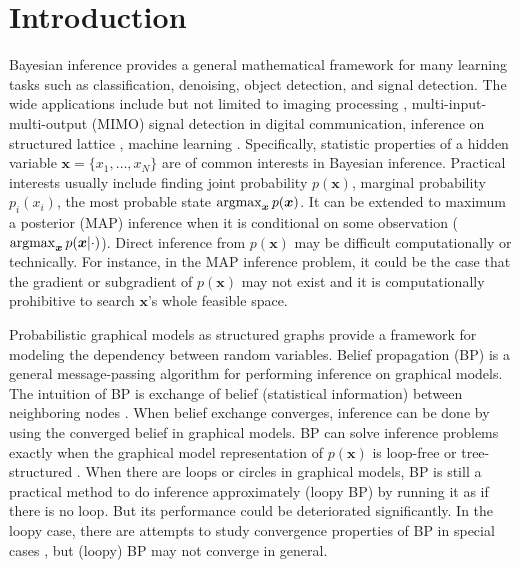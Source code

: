 \documentclass[conference]{IEEEtran}
\begin{document}
\section{Introduction}\label{sec:introduction}
Bayesian inference provides a general mathematical framework for many learning tasks such as classification, denoising, object detection, and signal detection. The wide applications include but not limited to imaging processing \cite{zhang2013denoise}, multi-input-multi-output (MIMO) signal detection in digital communication\cite{cespedes2014ep}, inference on structured lattice \cite{10.2307/25651244}, machine learning  \cite{2018arXiv180607066M, Lin:2015:DLM:2969239.2969280, yoon2019inferenceGraph}.
Specifically, statistic properties of a hidden variable $\bm{x} = \{x_1,\dots,x_N\}$ are of common interests in Bayesian inference. Practical interests usually include finding joint probability $p(\bm{x})$, marginal probability $p_i(x_i)$, the most probable state $\operatorname{argmax}_{\bm{x}} p(\bm{x})$. It can be extended to maximum a posterior (MAP) inference when it is conditional on some observation ($\operatorname{argmax}_{\bm{x}}p(\bm{x} | \cdot)$). Direct inference from $p(\bm{x})$ may be difficult computationally or technically. For instance, in the MAP inference problem, it could be the case that the gradient or subgradient of $p(\bm{x})$ may not exist and it is computationally prohibitive to search $\bm{x}$'s whole feasible space.


Probabilistic graphical models as structured graphs provide a framework for modeling the dependency between random variables. Belief propagation (BP) is a general message-passing algorithm for performing inference on graphical models. The intuition of BP is exchange of belief (statistical information) between neighboring nodes \cite{Bishop:2006:PRM:1162264}. When belief exchange converges, inference can be done by using the converged belief in graphical models. BP can solve inference problems exactly when the graphical model representation of $p(\bm{x})$ is loop-free or tree-structured \cite{kschischang2001factor_graph}.
When there are loops or circles in graphical models, BP is still a practical method to do inference approximately (loopy BP) by running it as if there is no loop. But its performance could be deteriorated significantly. In the loopy case,
there are attempts to study convergence properties of BP in special cases \cite{Ihler:2005:LBP:1046920.1088703, du2017convergenceBP}, but (loopy) BP may not converge in general.
\end{document}
